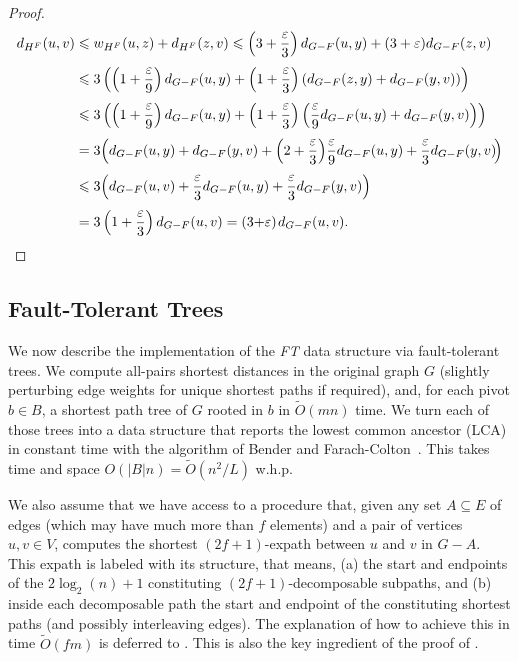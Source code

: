 \documentclass{article}\usepackage[a4paper,margin=20mm]{geometry}
\newcommand*{\Otilde}{\widetilde{O}}
\newcommand*{\nwspace}{\hspace*{.1em}}
\renewcommand{\le}{\leqslant}
\newcommand{\eps}{\varepsilon}
\begin{document}
\begin{proof}
 \begin{align*}
    d_{H^F}(u,v) &\le w_{H^F}(u,z) + d_{H^F}(z,v)
      \le \left(3+\frac{\eps}{3}\right)  d_{G-F}(u,y)
        + (3+\eps)  d_{G-F}(z,v)\\[.33em]
      &\le 3 \left(\left(1+\frac{\eps}{9}\right) d_{G-F}(u,y)
        + \left(1+\frac{\eps}{3} \right) \left(d_{G-F}(z,y) + d_{G-F}(y,v) \right) \right)\\[.33em]
      &\le 3 \left(\left(1+\frac{\eps}{9}\right) d_{G-F}(u,y)
        + \left(1+\frac{\eps}{3} \right) \left( \frac{\eps}{9}  d_{G-F}(u,y) 
          + d_{G-F}(y,v) \right) \right)\\[.33em]
      &= 3 \Big( d_{G-F}(u,y) + d_{G-F}(y,v) 
        + \left(2+\frac{\eps}{3} \right) \!\frac{\eps}{9}  d_{G-F}(u,y) 
        + \frac{\eps}{3}  d_{G-F}(y,v) \!\Big)\\[.33em]
      &\le  3 \Big(d_{G-F}(u,v) + \frac{\eps}{3}  d_{G-F}(u,y) 
        + \frac{\eps}{3}  d_{G-F}(y,v) \Big)\\[.33em]
      &= 3 \left(1+\frac{\eps}{3} \right)  d_{G-F}(u,v)
       = (3 {+} \eps) \nwspace d_{G-F}(u,v). \qedhere
  \end{align*}
\end{proof}


\subsection{Fault-Tolerant Trees}
\label{subsec:sublinear_FT-trees}

We now describe the implementation of the \emph{FT} data structure
via fault-tolerant trees.
We compute all-pairs shortest distances in the original graph $G$ 
(slightly perturbing edge weights for unique shortest paths if required),
and, for each pivot $b \in B$, a shortest path tree of $G$ rooted in $b$
in $\Otilde(mn)$ time.
We turn each of those trees into a data structure that reports
the lowest common ancestor (LCA) in constant time
with the algorithm of Bender and Farach-Colton~\cite{BenderFarachColton00LCARevisited}.
This takes time and space $O(|B|n) = \Otilde(n^2/L)$ w.h.p.

We also assume that we have access to a procedure
that, given any set $A \subseteq E$ of edges 
(which may have much more than $f$ elements) and a pair of vertices $u,v \in V$,
computes the shortest $(2f{+}1)$-expath between $u$ and $v$
in $G{-}A$.
This expath is labeled with its structure,
that means, (a) the start and endpoints of the $2\log_2(n)+1$
constituting $(2f{+}1)$-decomposable subpaths,
and (b) inside each decomposable path the start and endpoint of the constituting shortest paths
(and possibly interleaving edges). 
The explanation of how to achieve this in time $\Otilde(fm)$ is deferred to .
This is also the key ingredient of the proof of .
\end{document}
